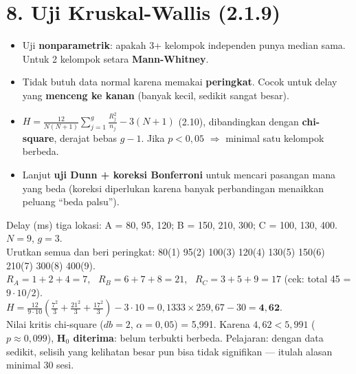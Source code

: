 \section*{8. Uji Kruskal-Wallis (2.1.9)}
\begin{itemize}
  \item Uji \textbf{nonparametrik}: apakah 3+ kelompok independen punya median sama. Untuk 2 kelompok setara \textbf{Mann-Whitney}.
  \item Tidak butuh data normal karena memakai \textbf{peringkat}. Cocok untuk delay yang \textbf{menceng ke kanan} (banyak kecil, sedikit sangat besar).
  \item $H=\frac{12}{N(N+1)}\sum_{j=1}^{g}\frac{R_j^2}{n_j}-3(N+1)$ (2.10), dibandingkan dengan \textbf{chi-square}, derajat bebas $g-1$. Jika $p<0{,}05$ $\Rightarrow$ minimal satu kelompok berbeda.
  \item Lanjut \textbf{uji Dunn + koreksi Bonferroni} untuk mencari pasangan mana yang beda (koreksi diperlukan karena banyak perbandingan menaikkan peluang ``beda palsu'').
\end{itemize}
\begin{contoh}
Delay (ms) tiga lokasi: A = 80, 95, 120; B = 150, 210, 300; C = 100, 130, 400. $N=9$, $g=3$.\\
Urutkan semua dan beri peringkat: 80(1) 95(2) 100(3) 120(4) 130(5) 150(6) 210(7) 300(8) 400(9).\\
$R_A=1+2+4=7$, \ $R_B=6+7+8=21$, \ $R_C=3+5+9=17$ (cek: total 45 = $9\cdot10/2$).\\
$H=\frac{12}{9\cdot10}\left(\frac{7^2}{3}+\frac{21^2}{3}+\frac{17^2}{3}\right)-3\cdot10=0{,}1333\times259{,}67-30=\mathbf{4{,}62}$.\\
Nilai kritis chi-square ($db=2$, $\alpha=0{,}05$) = 5,991. Karena $4{,}62<5{,}991$ ($p\approx0{,}099$), \textbf{H$_0$ diterima}: belum terbukti berbeda. Pelajaran: dengan data sedikit, selisih yang kelihatan besar pun bisa tidak signifikan --- itulah alasan minimal 30 sesi.
\end{contoh}

